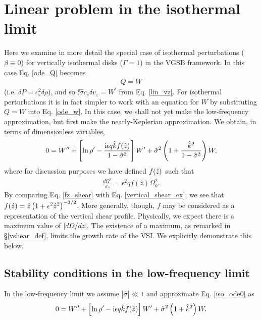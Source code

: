\section{Linear problem in the isothermal limit}\label{iso_discuss}  
Here we examine in more detail the special case of isothermal
perturbations ($\beta\equiv 0$) for vertically isothermal disks 
($\Gamma=1$) in the VGSB framework.   
In this case Eq. \ref{ode_Q} becomes   
\begin{align} 
  Q = W 
\end{align}
(i.e. $\delta P = c_s^2\delta \rho$), and so $  \ii\hat{\sigma}c_s\delta v_z = W^\prime $
from Eq. \ref{lin_vz}. For isothermal perturbations it is in fact
simpler to work with an equation for $W$ by substituting $Q=W$ into
Eq. \ref{ode_w}. In this case, we shall not yet make the low-frequency
approximation, but first make the nearly-Keplerian approximation. We
obtain, in terms of dimensionless variables, 
\begin{align}
  0 = W^{\prime\prime} + \left[\ln\rho^\prime - \frac{\mathrm{i} \epsilon q \hat{k} f(\hat{z})
      }{1-\hat{\sigma}^2} \right]W^\prime +
  \hat{\sigma}^2\left(1+\frac{\hat{k}^2}{1-\hat{\sigma}^2}\right)W,\label{iso_ode0} 
\end{align}
where for discussion purposes we have defined $f(\hat{z})$ such that
\begin{align}\label{fz_shear}
  \frac{d\Omega^2}{d\hat{z}} = \epsilon^2q f(\hat{z})\Omega_k^2.
\end{align}
By comparing Eq. \ref{fz_shear} with Eq. \ref{vertical_shear_ex}, we
see that $f(\hat{z})= 
\hat{z}\left(1+\epsilon^2\hat{z}^2\right)^{-3/2}$. More generally, though,
$f$ may be considered as a representation of the vertical
shear profile. Physically, we expect there is a maximum value of 
$|d\Omega/dz|$. The existence of a maximum, as remarked in
\S\ref{vshear_def}, limits the growth rate of the VSI. We explicitly
demonstrate this below.    

\subsection{Stability conditions in the low-frequency limit}
In the low-frequency limit we assume $|\hat{\sigma}|\ll 1$ and
approximate Eq. \ref{iso_ode0} as 
\begin{align}
  0 = W^{\prime\prime} + \left[\ln\rho^\prime - \mathrm{i} \epsilon q \hat{k}
    f(\hat{z})\right]W^\prime +
  \hat{\sigma}^2\left(1+\hat{k}^2\right)W. \label{iso_ode1}
\end{align}
